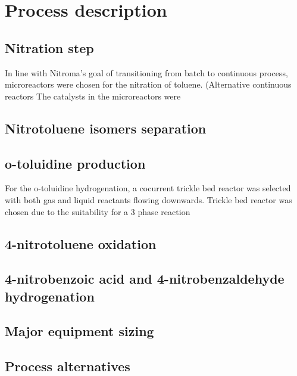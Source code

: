 \section{Process description}
\label{sec:process}
\subsection{Nitration step}
In line with Nitroma's goal of transitioning from batch to continuous process, microreactors were chosen for the nitration of toluene. (Alternative continuous reactors 
The catalysts in the microreactors were 
\subsection{Nitrotoluene isomers separation}



\subsection{o-toluidine production}
For the o-toluidine hydrogenation, a cocurrent trickle bed reactor was selected
with both gas and liquid reactants flowing downwards. Trickle bed reactor was chosen 
due to the suitability for a 3 phase reaction 

\subsection{4-nitrotoluene oxidation}

\subsection{4-nitrobenzoic acid and 4-nitrobenzaldehyde hydrogenation}


\subsection{Major equipment sizing}


\subsection{Process alternatives}



